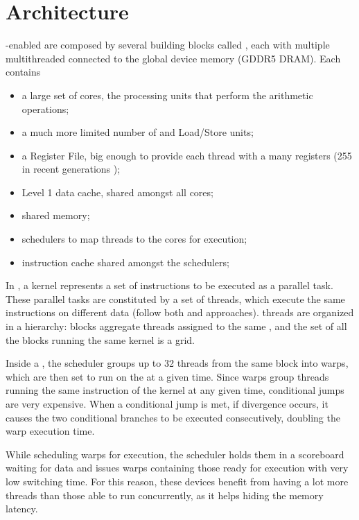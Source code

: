 \documentclass[../thesis]{subfiles}
\begin{document}
	\section{Architecture}
	\label{sec:cuda:arch}
	
	\cuda-enabled \gpus are composed by several building blocks called \gpcs, each with multiple multithreaded \sms connected to the global device memory (GDDR5 DRAM). Each \sm contains
	\begin{itemize}
		\item a large set of \cuda cores, the processing units that perform the arithmetic operations;
		\item a much more limited number of \sfus and Load/Store units;
		\item a Register File, big enough to provide each thread with a many registers (255 in recent generations \cite{CUDA:GK110});
		\item Level 1 data cache, shared amongst all cores;
		\item shared memory;
		\item schedulers to map threads to the cores for execution;
		\item instruction cache shared amongst the schedulers;
	\end{itemize}

	In \cuda, a kernel represents a set of instructions to be executed as a parallel task. These parallel tasks are constituted by a set of \cuda threads, which execute the same instructions on different data (follow both \simd and \simt approaches). \cuda threads are organized in a hierarchy: blocks aggregate threads assigned to the same \sm, and the set of all the blocks running the same kernel is a grid.

	Inside a \sm, the scheduler groups up to 32 threads from the same block into warps, which are then set to run on the \sm at a given time. Since warps group threads running the same instruction of the kernel at any given time, conditional jumps are very expensive. When a conditional jump is met, if divergence occurs, it causes the two conditional branches to be executed consecutively, doubling the warp execution time.

	While scheduling warps for execution, the scheduler holds them in a scoreboard waiting for data and issues warps containing those ready for execution with very low switching time. For this reason, these devices benefit from having a lot more threads than those able to run concurrently, as it helps hiding the memory latency.
\end{document}
